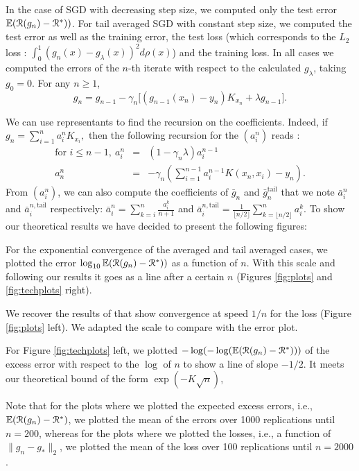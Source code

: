%
In the case of SGD with decreasing step size, we computed only the test error $\mathbb{E}({\cal R}(g_n)-{\cal R}^*))$. For tail averaged SGD with constant step size, we computed the test error as well as the training error, the test loss (which corresponds to the $L_2$ loss : $\int_0^1 (g_n (x) - g_\lambda(x))^2d\rho(x)$) and the training loss.
%
In all cases we computed the errors of the $n$-th iterate with respect to the calculated $g_\lambda$, taking $g_0 = 0$. For any $n \geqslant 1$,
$$g_n  =  {g}_{n-1} - \gamma_n  \big[ ( {g}_{n-1}(x_n)- y_n)K_{x_n}   + \lambda{g}_{n-1}  \big]. $$

We can use representants to find the recursion on the coefficients. Indeed, if  $g_n = \sum_{i = 1}^n a^n_i K_{x_i},$ then the following recursion for the $(a_i^n)$ reads : 
\begin{eqnarray*}
\text{for } i \leqslant n-1, \ a_i^n &=& (1-\gamma_n \lambda) a_i^{n-1} \\
a_n^n &=& -\gamma_n (\sum_{i = 1}^{n-1} a_i^{n-1} K(x_n,x_i)-y_n).
\end{eqnarray*}
%
From $(a_i^n)$, we can also compute the coefficients of $\bar{g}_n$ and $\bar{g}_n^{\textrm {tail}}$ that we note $\bar{a}^n_i$ and $\bar{a}^{n,\textrm {tail}}_i$ respectively: $\bar{a}^n_i = \sum_{k = i}^n \frac{a_i^k}{n+1}$ and $\bar{a}^{n,\textrm {tail}}_i = \frac{1}{\lfloor n/2 \rfloor}\sum_{k = \lfloor n/2 \rfloor }^n a_i^k.$
%
To show our theoretical results we have decided to present the following figures: 

\BIT
\item For the exponential convergence of the averaged and tail averaged cases, we plotted the error $\log_{10}\mathbb{E}({\cal R}(g_n)-{\cal R}^*))$ as a function of $n$. With this scale and following our results it goes as a line after a certain $n$ (Figures \ref{fig:plots} and \ref{fig:techplots} right).
\item We recover the results of \citet{daft} that show convergence at speed $1/n$ for the loss (Figure \ref{fig:plots} left). We adapted the scale to compare with the error plot.
\item For Figure \ref{fig:techplots} left, we plotted $-\log (- \log (\mathbb{E}({\cal R}(g_n)-{\cal R}^*)) ) $ of the excess error with respect to the $\log$ of $n$ to show a line of slope $-1/2$. It meets our theoretical bound of the form $\exp(-K\sqrt{n})$, 
\EIT

Note that for the plots where we plotted the expected excess errors, i.e., $\mathbb{E}({\cal R}(g_n)-{\cal R}^*)$, we plotted the mean of the errors over 1000 replications until $n = 200$, whereas for the plots where we plotted the losses, i.e., a function of $\|g_n- g_*\|_2$, we plotted the mean of the loss over 100 replications until $n = 2000$.


